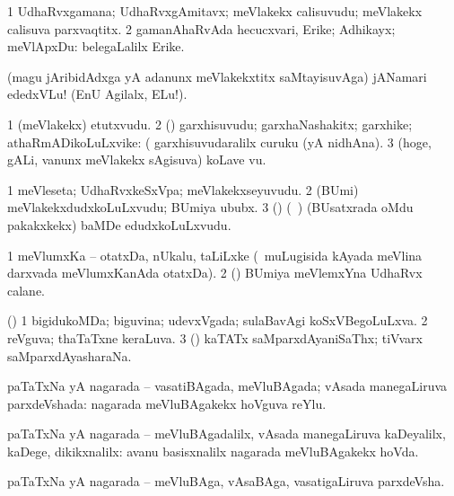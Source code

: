 \bentry
{} 
\gl{\nA}
\bmng
\bnum
\num{1} UdhaRvxgamana; UdhaRvxgAmitavx; meVlakekx calisuvudu; meVlakekx calisuva parxvaqtitx. 
\num{2} gamanAhaRvAda hecucxvari, Erike; Adhikayx; meVlApxDu:  belegaLalilx Erike. 
\enum
\emng
\eentry

\bentry
{} 
\gl{\BAavayx}
\expl{}
\bmng
(magu jAribidAdxga yA adanunx meVlakekxtitx saMtayisuvAga) jANamari ededxVLu! (EnU Agilalx, ELu!). 
\emng
\eentry

\bentry
{} 
\gl{\nA}
\expl{}
\bmng
\bnum
\num{1} (meVlakekx) etutxvudu. 
\num{2} (\AmA) garxhisuvudu; garxhaNashakitx; garxhike; athaRmADikoLuLxvike:  (  garxhisuvudaralilx curuku (yA nidhAna). 
\num{3} (hoge, gALi, \mo vanunx meVlakekx sAgisuva) koLave \mo vu. 
\enum
\emng
\eentry

\bentry
{} 
\gl{\nA}
\bmng
\bnum
\num{1} meVleseta; UdhaRvxkeSxVpa; meVlakekxseyuvudu. 
\num{2} (BUmi) meVlakekxdudxkoLuLxvudu; BUmiya ububx. 
\num{3} (\BUvi) (\kanmu\ \gaNi) (BUsatxrada oMdu pakakxkekx) baMDe edudxkoLuLxvudu. 
\enum
\emng
\eentry

\bentry
{} 
\gl{\nA}
\expl{}
\bmng
\bnum
\num{1} meVlumxKa -- otatxDa, nUkalu, taLiLxke (\udA\ muLugisida kAyada meVlina darxvada meVlumxKanAda otatxDa). 
\num{2} (\BUvi) BUmiya meVlemxYna UdhaRvx calane. 
\enum
\emng
\eentry

\bentry
{} 
\gl{\gu}
\expl{}
\bmng
(\AmA) 
\bnum
\num{1} bigidukoMDa; biguvina; udevxVgada; sulaBavAgi koSxVBegoLuLxva. 
\num{2} reVguva; thaTaTxne keraLuva. 
\num{3} (\ame) kaTATx saMparxdAyaniSaThx; tiVvarx saMparxdAyasharaNa. 
\enum
\emng
\eentry

\bentry
{} 
\gl{\gu}
\expl{}
\bmng
paTaTxNa yA nagarada -- vasatiBAgada, meVluBAgada; vAsada manegaLiruva parxdeVshada:  nagarada meVluBAgakekx hoVguva reYlu. 
\emng
\eentry

\bentry
{} 
\gl{\kirxvi}
\expl{}
\bmng
paTaTxNa yA nagarada -- meVluBAgadalilx, vAsada manegaLiruva kaDeyalilx, kaDege, dikikxnalilx:  avanu basisxnalilx nagarada meVluBAgakekx hoVda. 
\emng
\eentry

\bentry
{} 
\gl{\nA}
\expl{}
\bmng
paTaTxNa yA nagarada -- meVluBAga, vAsaBAga, vasatigaLiruva parxdeVsha. 
\emng
\eentry

